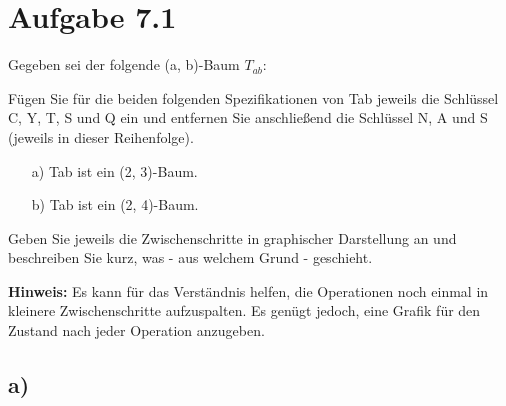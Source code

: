 \documentclass[a4paper]{article}
\begin{document}
\section*{Aufgabe 7.1}
Gegeben sei der folgende (a, b)-Baum $T_{ab}$:

\begin{center}
\end{center}

Fügen Sie für die beiden folgenden Spezifikationen von Tab jeweils die Schlüssel C, Y, T, S und Q ein und entfernen Sie anschließend die Schlüssel N, A und S (jeweils in dieser Reihenfolge).

\begin{enumerate}
    \item[ a)] Tab ist ein (2, 3)-Baum.
    \item[ b)] Tab ist ein (2, 4)-Baum.
\end{enumerate}

Geben Sie jeweils die Zwischenschritte in graphischer Darstellung an und beschreiben Sie kurz, was - aus welchem Grund - geschieht.

\textbf{Hinweis:} Es kann für das Verständnis helfen, die Operationen noch einmal in kleinere Zwischenschritte aufzuspalten. Es genügt jedoch, eine Grafik für den Zustand nach jeder Operation anzugeben.

\subsection*{a)}
\end{document}

